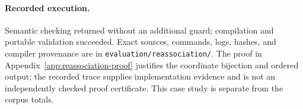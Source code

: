 \paragraph{Recorded execution.}
Semantic checking returned  without an additional guard;
compilation and portable validation succeeded. Exact sources, commands,
logs, hashes, and compiler provenance are in
\nolinkurl{evaluation/reassociation/}. The proof in
Appendix~\ref{app:reassociation-proof} justifies the coordinate bijection
and ordered output; the recorded trace supplies implementation evidence
and is not an independently checked proof certificate. This case study
is separate from the corpus totals.
